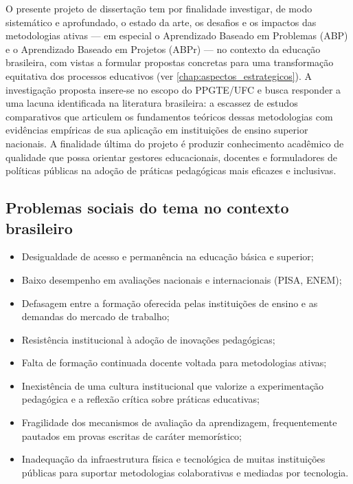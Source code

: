 O presente projeto de dissertação tem por finalidade investigar, de modo sistemático e aprofundado, o estado da arte, os desafios e os impactos das metodologias ativas — em especial o Aprendizado Baseado em Problemas (ABP) e o Aprendizado Baseado em Projetos (ABPr) — no contexto da educação brasileira, com vistas a formular propostas concretas para uma transformação equitativa dos processos educativos (ver \ref{chap:aspectos_estrategicos}). A investigação proposta insere-se no escopo do PPGTE/UFC e busca responder a uma lacuna identificada na literatura brasileira: a escassez de estudos comparativos que articulem os fundamentos teóricos dessas metodologias com evidências empíricas de sua aplicação em instituições de ensino superior nacionais. A finalidade última do projeto é produzir conhecimento acadêmico de qualidade que possa orientar gestores educacionais, docentes e formuladores de políticas públicas na adoção de práticas pedagógicas mais eficazes e inclusivas.

\subsection{Problemas sociais do tema no contexto brasileiro}
\label{subsec:problemas_sociais}

\begin{itemize}
    \item Desigualdade de acesso e permanência na educação básica e superior;
    \item Baixo desempenho em avaliações nacionais e internacionais (PISA, ENEM);
    \item Defasagem entre a formação oferecida pelas instituições de ensino e as demandas do mercado de trabalho;
    \item Resistência institucional à adoção de inovações pedagógicas;
    \item Falta de formação continuada docente voltada para metodologias ativas;
    \item Inexistência de uma cultura institucional que valorize a experimentação pedagógica e a reflexão crítica sobre práticas educativas;
    \item Fragilidade dos mecanismos de avaliação da aprendizagem, frequentemente pautados em provas escritas de caráter memorístico;
    \item Inadequação da infraestrutura física e tecnológica de muitas instituições públicas para suportar metodologias colaborativas e mediadas por tecnologia.
\end{itemize}

